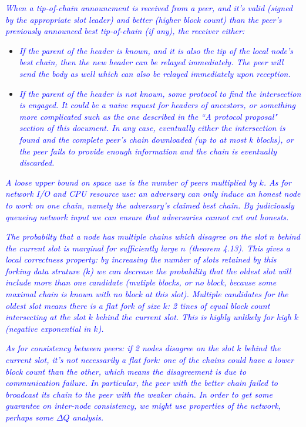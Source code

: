 \documentclass{article}
\newcommand{\avieth}[1]{\textcolor{blue}{\emph{#1}}}
\theoremstyle{definition}{
  \newtheorem{lemma}{Lemma}[section] %
  \newtheorem{definition}[lemma]{Definition}
}
\theoremstyle{theorem}{
  \newtheorem{invariant}[lemma]{Invariant}
  \newtheorem{proofobligation}[lemma]{Proof Obligation}
}
\numberwithin{equation}{lemma}
\begin{document}
\avieth{When a tip-of-chain announcment is received from a peer, and it's valid
  (signed by the appropriate slot leader) and better (higher block count) than
  the peer's previously announced best tip-of-chain (if any), the receiver
  either:\\}

  \begin{itemize}
    \item \avieth{If the parent of the header is known, and it is also the tip of the
          local node's best chain, then the new header can be relayed
          immediately. The peer will send the body as well which can also be
          relayed immediately upon reception.}
    \item \avieth{If the parent of the header is not known, some protocol to find
          the intersection is engaged. It could be a naive request for headers
          of ancestors, or something more complicated such as the one described
          in the ``A protocol proposal" section of this document. In any case,
          eventually either the intersection is found and the complete peer's
          chain downloaded (up to at most $k$ blocks), or the peer fails to
          provide enough information and the chain is eventually discarded.}
  \end{itemize}

  \avieth{A loose upper bound on space use is the number of peers multiplied by $k$.
  As for network I/O and CPU resource use: an adversary can only induce an
  honest node to work on one chain, namely the adversary's claimed best chain.
  By judiciously queueing network input we can ensure that adversaries cannot
  cut out honests.}

  \avieth{The probabilty that a node has multiple chains which disagree on the
  slot $n$ behind the current slot is marginal for sufficiently large $n$
  (theorem 4.13). This gives a local correctness property: by increasing the
  number of slots retained by this forking data struture ($k$) we can
  decrease the probability that the oldest slot will include more than one
  candidate (mutiple blocks, or no block, because some maximal chain is known
  with no block at this slot). Multiple candidates for the oldest slot means
  there is a flat fork of size $k$: 2 tines of equal block count intersecting
  at the slot $k$ behind the current slot. This is highly unlikely for high
  $k$ (negative exponential in $k$).}

  \avieth{As for consistency between peers: if 2 nodes disagree on the slot $k$ behind
  the current slot, it's not necessarily a flat fork: one of the chains could
  have a lower block count than the other, which means the disagreement is due
  to communication failure. In particular, the peer with the better chain
  failed to broadcast its chain to the peer with the weaker chain. In order to
  get some guarantee on inter-node consistency, we might use properties of
  the network, perhaps some $\Delta Q$ analysis.}
\end{document}
